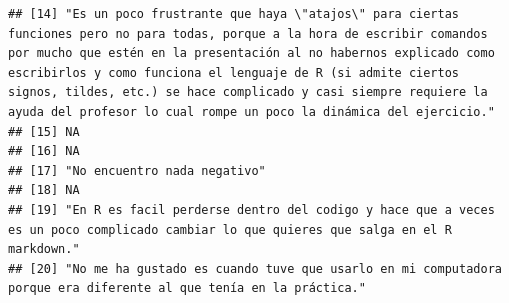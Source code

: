 \documentclass[
]{article}
\begin{document}
\begin{verbatim}
## [14] "Es un poco frustrante que haya \"atajos\" para ciertas funciones pero no para todas, porque a la hora de escribir comandos por mucho que estén en la presentación al no habernos explicado como escribirlos y como funciona el lenguaje de R (si admite ciertos signos, tildes, etc.) se hace complicado y casi siempre requiere la ayuda del profesor lo cual rompe un poco la dinámica del ejercicio."
## [15] NA                                                                                                                                                                                                                                                                                                                                                                                                       
## [16] NA                                                                                                                                                                                                                                                                                                                                                                                                       
## [17] "No encuentro nada negativo"                                                                                                                                                                                                                                                                                                                                                                             
## [18] NA                                                                                                                                                                                                                                                                                                                                                                                                       
## [19] "En R es facil perderse dentro del codigo y hace que a veces es un poco complicado cambiar lo que quieres que salga en el R markdown."                                                                                                                                                                                                                                                                   
## [20] "No me ha gustado es cuando tuve que usarlo en mi computadora porque era diferente al que tenía en la práctica."                                                                                                                                                                                                                                                                                         

\end{verbatim}
\end{document}
